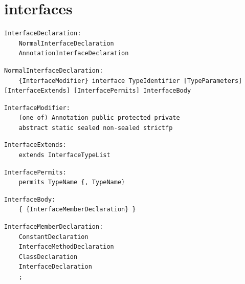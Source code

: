 \section{interfaces}

\noindent\textbf{\texttt{}}\par
\begin{lstlisting}
InterfaceDeclaration:
    NormalInterfaceDeclaration
    AnnotationInterfaceDeclaration
\end{lstlisting}

\noindent\textbf{\texttt{}}\par
\begin{lstlisting}
NormalInterfaceDeclaration:
    {InterfaceModifier} interface TypeIdentifier [TypeParameters] [InterfaceExtends] [InterfacePermits] InterfaceBody
\end{lstlisting}

\noindent\textbf{\texttt{}}\par
\begin{lstlisting}
InterfaceModifier:
    (one of) Annotation public protected private
    abstract static sealed non-sealed strictfp
\end{lstlisting}

\noindent\textbf{\texttt{}}\par
\begin{lstlisting}
InterfaceExtends:
    extends InterfaceTypeList
\end{lstlisting}

\noindent\textbf{\texttt{}}\par
\begin{lstlisting}
InterfacePermits:
    permits TypeName {, TypeName}
\end{lstlisting}

\noindent\textbf{\texttt{}}\par
\begin{lstlisting}
InterfaceBody:
    { {InterfaceMemberDeclaration} }
\end{lstlisting}

\noindent\textbf{\texttt{}}\par
\begin{lstlisting}
InterfaceMemberDeclaration:
    ConstantDeclaration
    InterfaceMethodDeclaration
    ClassDeclaration
    InterfaceDeclaration
    ;
\end{lstlisting}

